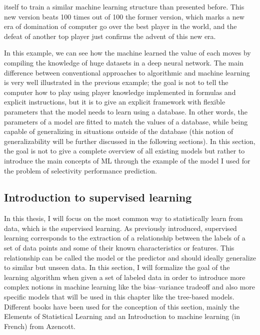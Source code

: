 \documentclass[main]{subfiles}
\begin{document}
itself to train a similar machine learning structure than presented before. This new version beats 100 times out of 100 the former version,\autocite{Silver_2017} which marks a new era of domination of computer go over the best player in the world, and the defeat of another top player just confirms the advent of this new era. 

In this example, we can see how the machine learned the value of each moves by compiling the knowledge of huge datasets in a deep neural network. The main difference between conventional approaches to algorithmic and machine learning is very well illustrated in the previous example; the goal is not to tell the computer how to play using player knowledge implemented in formulas and explicit instructions, but it is to give an explicit framework with flexible parameters that the model needs to learn using a database. In other words, the parameters of a model are fitted to match the values of a database, while being capable of generalizing in situations outside of the database (this notion of generalizability will be further discussed in the following sections). In this section, the goal is not to give a complete overview of all existing models but rather to introduce the main concepts of ML through the example of the model I used for the problem of selectivity performance prediction.

\subsection{Introduction to supervised learning}

In this thesis, I will focus on the most common way to statistically learn from data, which is the supervised learning. As previously introduced, supervised learning corresponds to the extraction of a relationship between the labels of a set of data points and some of their known characteristics or features. This relationship can be called the model or the predictor and should ideally generalize to similar but unseen data. In this section, I will formalize the goal of the learning algorithm when given a set of labeled data in order to introduce more complex notions in machine learning like the bias--variance tradeoff and also more specific models that will be used in this chapter like the tree-based models. Different books have been used for the conception of this section, mainly the Elements of Statistical Learning\autocite{Hastie_2009} and an Introduction to machine learning (in French) from Azencott\autocite{azencott2022introduction}.
\end{document}
